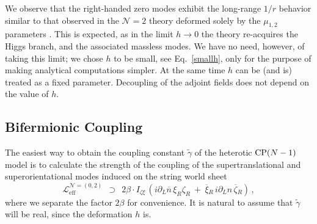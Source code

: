 \documentclass[12pt]{article}
\def\beq{\begin{equation}}
\def\eeq{\end{equation}}
\newcommand{\ntwo}{${\mathcal N}=2$ }
\newcommand{\p}{\partial}
\newcommand{\wt}{\widetilde}
\newcommand{\ov}{\overline}
\newcommand{\mc}[1]{\mathcal{#1}}
\newcommand{\bxir}{\ov{\xi}{}_R}
\newcommand{\xir}{\xi_R}
\newcommand{\bzr}{\ov{\zeta}{}_R}
\newcommand{\zr}{\zeta_R}
\newcommand{\nbar}{\ov{n}}
\newcommand{\tgamma}{\wt{\gamma}}
\begin{document}
We observe that the right-handed zero modes exhibit the long-range $1/r$ behavior similar to that observed
in the \ntwo theory deformed solely by the $\mu_{1,2}$ parameters \cite{GSYmmodel,SYhet}. 
This is expected, as in the limit $ h \to 0 $ the theory re-acquires the Higgs branch, and the associated
massless modes. 
We have no need, however, of taking this limit; we chose $ h $ to be small, 
see Eq.~\eqref{smallh}, only for the purpose of making analytical computations simpler. At the same time
$h$ can be (and is) treated as a fixed parameter. Decoupling of the adjoint fields does not depend
on the value of $h$.

\subsection{Bifermionic Coupling}

The easiest way to obtain the coupling constant $ \tgamma $ of the heterotic ${\rm CP}(N-1)$ model
is to calculate the strength of the coupling of the supertranslational and superorientational
modes induced on the string world sheet
\beq
\label{bif_norm}
	\mc{L}_\text{eff}^{\mc{N}=(0,2)} ~~\supset~~
	2\beta \cdot I_{\zeta\xi}\, ( i\p_L\nbar\,\xir\zr ~+~ \bxir\,i\p_L n\, \bzr )\,,
\eeq
where we separate the factor  $ 2\beta $ for convenience. 
It is natural to assume that $ \tgamma $ will be real, since the deformation $h$ is.
\end{document}
